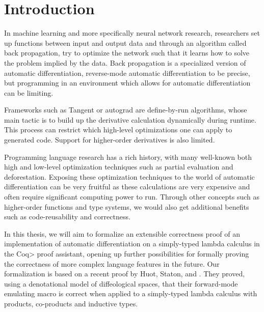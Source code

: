 \section{Introduction}
In machine learning and more specifically neural network research, researchers set up functions between input and output data and through an algorithm called back propagation, try to optimize the network such that it learns how to solve the problem implied by the data.
Back propagation is a specialized version of automatic differentiation, reverse-mode automatic differentiation to be precise, but programming in an environment which allows for automatic differentiation can be limiting.

Frameworks such as Tangent or autograd are define-by-run algorithms, whose main tactic is to build up the derivative calculation dynamically during runtime.
This process can restrict which high-level optimizations one can apply to generated code.
Support for higher-order derivatives is also limited.

Programming language research has a rich history, with many well-known both high and low-level optimization techniques such as partial evaluation and deforestation.
Exposing these optimization techniques to the world of automatic differentiation can be very fruitful as these calculations are very expensive and often require significant computing power to run.
Through other concepts such as higher-order functions and type systems, we would also get additional benefits such as code-reusability and correctness.

In this thesis, we will aim to formalize an extensible correctness proof of an implementation of automatic differentiation on a simply-typed lambda calculus in the \<Coq> proof assistant, opening up further possibilities for formally proving the correctness of more complex language features in the future.
Our formalization is based on a recent proof by Huot, Staton, and \Vakar{} \cite{huot2020correctness}.
They proved, using a denotational model of diffeological spaces, that their forward-mode emulating macro is correct when applied to a simply-typed lambda calculus with products, co-products and inductive types.

